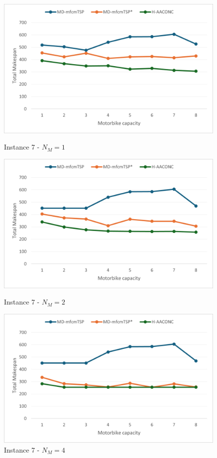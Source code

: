 \documentclass{article}
\begin{document}
	\begin{figure}[h]
		\centering
		\begin{minipage}{0.33\textwidth}
			\centering
			\includegraphics[scale=0.42]{p07_NM1}\;
			\caption{Instance 7 - $N_M=1$}
			\label{fig:p07_NM1}
		\end{minipage}
		\begin{minipage}{0.33\textwidth}
			\centering
			\includegraphics[scale=0.42]{p07_NM2}\;
			\caption{Instance 7 - $N_M=2$}
			\label{fig:p07_NM2}
		\end{minipage}
		\begin{minipage}{0.33\textwidth}
			\centering
			\includegraphics[scale=0.42]{p07_NM4}\;
			\caption{Instance 7 - $N_M=4$}
			\label{fig:p07_NM4}
		\end{minipage}
	\end{figure}
	
\end{document}
